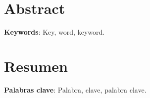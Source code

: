 \chapter*{Abstract}

	\Blindtext[8]
    
    \textbf{Keywords}: Key, word, keyword.



\chapter*{Resumen}

	\Blindtext[8]
    
    \textbf{Palabras clave}: Palabra, clave, palabra clave.